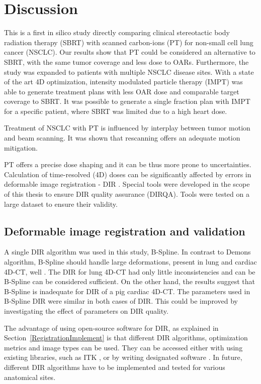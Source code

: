 \chapter{Discussion}

This is a first in silico study directly comparing clinical stereotactic body radiation therapy (SBRT) with scanned carbon-ions (PT) for non-small cell lung cancer (NSCLC). 
Our results show that PT could be considered an alternative to SBRT, with the same tumor coverage and less dose to OARs. Furthermore, the study was expanded to patients with multiple
NSCLC disease sites. With a state of the art 4D optimization, intensity modulated particle therapy (IMPT) was able to generate treatment plans with less OAR dose and comparable target coverage
to SBRT. It was possible to generate a single fraction plan with IMPT for a specific patient, where SBRT was limited due to a high heart dose.

Treatment of NSCLC with PT is influenced by interplay between tumor motion and beam scanning. It was shown that rescanning offers an
adequate motion mitigation. 

PT offers a precise dose shaping and it can be thus more prone to uncertainties. Calculation of time-resolved (4D) doses can be significantly
affected by errors in deformable image registration - DIR \cite{Heath2006}. Special tools were developed in the scope of this thesis to ensure DIR quality assurance (DIRQA).
Tools were tested on a large dataset to ensure their validity.


\section{Deformable image registration and validation}

A single DIR algorithm was used in this study, B-Spline. In contrast to Demons algorithm, B-Spline should handle large deformations, present in lung and cardiac 4D-CT, well \cite{Tang2013}.
The DIR for lung 4D-CT had only little inconsistencies and can be B-Spline can be considered sufficient. On the other hand, the results suggest that B-Spline is inadequate for
DIR of a pig cardiac 4D-CT. The parameters used
in B-Spline DIR were similar in both cases of DIR. This could be improved by investigating the effect of parameters on DIR quality. 

The advantage of using open-source software for DIR, as explained in Section~\ref{RegistrationImplement} is that different DIR algorithms, 
optimization metrics and image types can be used. They can be accessed either with using
existing libraries, such as ITK \cite{Yoo2002}, or by writing designated software \cite{Fedorov2015}. In future, different DIR algorithms have to be implemented 
and tested for various anatomical sites.


